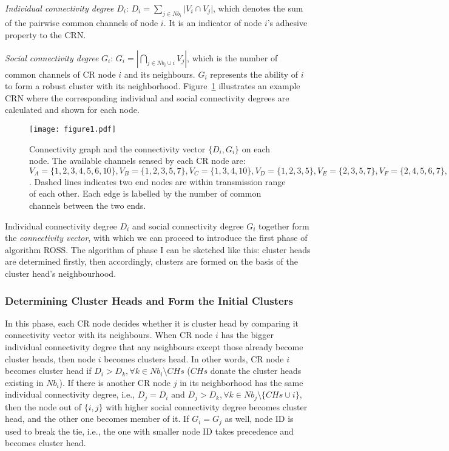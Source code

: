 \documentclass[journal,comsoc]{IEEEtran}
\theoremstyle{mytheoremstyle}
\theoremstyle{mytheoremstyle}
\theoremstyle{mytheoremstyle}
\newcommand{\ie}{i.e., }
\begin{document}
\textit{Individual connectivity degree} $D_i$: $D_i=\sum_{j\in Nb_i}\vert V_i\cap V_j\vert$, which denotes the sum of the pairwise common channels of node $i$. 
It is an indicator of node $i$'s adhesive property to the CRN. 

\textit{Social connectivity degree} $G_i$: $G_i=|\bigcap_{j\in Nb_i\cup i}V_j|$, which is the number of common channels of CR node $i$ and its neighbours.
$G_i$ represents the ability of $i$ to form a robust cluster with its neighborhood.
Figure~\ref{fig1} illustrates an example CRN where the corresponding individual and social connectivity degrees are calculated and shown for each node.
\begin{figure}[ht!]
  \centering
\texttt{[image: figure1.pdf]}
	\caption{Connectivity graph and the connectivity vector $\{D_i, G_i\}$ on each node. The available channels sensed by each CR node are: $V_A=\{1,2,3,4,5,6,10\}, V_B=\{1,2,3,5,7\}, V_C=\{1,3,4,10\}, V_D=\{1,2,3,5\}, V_E=\{2,3,5,7\}, V_F=\{2,4,5,6,7\}, V_G=\{1,2,3,4,8\}, V_H=\{1,2,5,8\}$. Dashed lines indicates two end nodes are within transmission range of each other. Each edge is labelled by the number of common channels between the two ends.}
	\label{fig1}
\end{figure}
Individual connectivity degree $D_i$ and social connectivity degree $G_i$ together form the \textit{connectivity vector}, with which we can proceed to introduce the first phase of algorithm ROSS.
The algorithm of phase I can be sketched like this: cluster heads are determined firstly, then accordingly, clusters are formed on the basis of the cluster head's neighbourhood.

\subsubsection{Determining Cluster Heads and Form the Initial Clusters}
In this phase, each CR node decides whether it is cluster head by comparing it connectivity vector with its neighbours.
When CR node $i$ has the bigger individual connectivity degree that any neighbours except those already become cluster heads, then node $i$ becomes clusters head.
In other words, CR node $i$ becomes cluster head if $D_i > D_k, \forall k\in Nb_i\setminus CHs$ ($CHs$ donate the cluster heads existing in $Nb_i$).
If there is another CR node $j$ in its neighborhood has the same individual connectivity degree, \ie $D_j = D_i$ and $D_j > D_{k}, \forall k\in Nb_j\setminus \{CHs\cup i\}$, then the node out of $\{i, j\}$ with higher social connectivity degree becomes cluster head, and the other one becomes member of it. 
If $G_i = G_j$ as well, node ID is used to break the tie, \ie the one with smaller node ID takes precedence and becomes cluster head.
\end{document}
